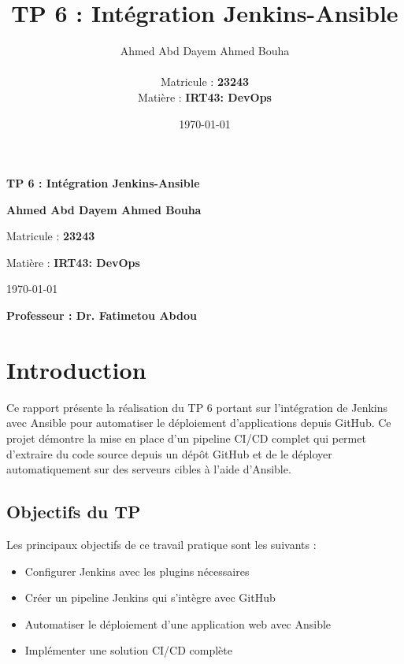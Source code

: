 \documentclass{article}
\title{\Huge{\textbf{TP 6 : Intégration Jenkins-Ansible}}}
\author{\Large{Ahmed Abd Dayem Ahmed Bouha} \\ \\ \large{Matricule : \textbf{23243}} \\ \vspace{2cm} \large{Matière : \textbf{IRT43: DevOps}}}
\date{\today}
\begin{document}
\begin{titlepage}
    \centering
    \vspace*{2cm}
    {\Huge\bfseries TP 6 : Intégration Jenkins-Ansible\par}
    \vspace{2cm}
    {\LARGE\bfseries Ahmed Abd Dayem Ahmed Bouha\par}
    \vspace{0.5cm}
    {\large Matricule : \textbf{23243}\par}
    \vspace{1.5cm}
    {\large Matière : \textbf{IRT43: DevOps}\par}
    \vspace{1.5cm}
    {\large\today\par}
    \vspace{1.5cm}
    {\LARGE\bfseries Professeur : Dr. Fatimetou Abdou\par}
    \vspace{1cm}
\end{titlepage}

\tableofcontents
\thispagestyle{empty}
\newpage

\setcounter{page}{1}
\section{Introduction}
Ce rapport présente la réalisation du TP 6 portant sur l'intégration de Jenkins avec Ansible pour automatiser le déploiement d'applications depuis GitHub. Ce projet démontre la mise en place d'un pipeline CI/CD complet qui permet d'extraire du code source depuis un dépôt GitHub et de le déployer automatiquement sur des serveurs cibles à l'aide d'Ansible.

\subsection{Objectifs du TP}
Les principaux objectifs de ce travail pratique sont les suivants :
\begin{itemize}
    \item Configurer Jenkins avec les plugins nécessaires
    \item Créer un pipeline Jenkins qui s'intègre avec GitHub
    \item Automatiser le déploiement d'une application web avec Ansible
    \item Implémenter une solution CI/CD complète
\end{itemize}
\end{document}
